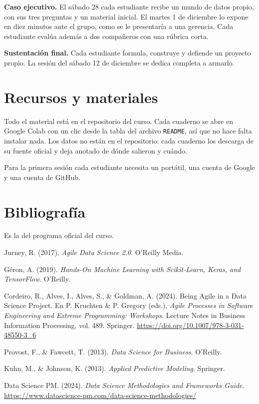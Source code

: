 \documentclass[12pt,letterpaper]{article}
\begin{document}
\textbf{Caso ejecutivo.} El sábado 28 cada estudiante recibe un mundo de datos propio, con sus tres preguntas y un material inicial. El martes 1 de diciembre lo expone en diez minutos ante el grupo, como se le presentaría a una gerencia. Cada estudiante evalúa además a dos compañeros con una rúbrica corta.

\textbf{Sustentación final.} Cada estudiante formula, construye y defiende un proyecto propio. La sesión del sábado 12 de diciembre se dedica completa a armarlo.

\section{Recursos y materiales}
Todo el material está en el repositorio del curso. Cada cuaderno se abre en Google Colab con un clic desde la tabla del archivo \texttt{README}, así que no hace falta instalar nada. Los datos no están en el repositorio: cada cuaderno los descarga de su fuente oficial y deja anotado de dónde salieron y cuándo.

Para la primera sesión cada estudiante necesita un portátil, una cuenta de Google y una cuenta de GitHub.

\section{Bibliografía}
Es la del programa oficial del curso.

Jurney, R. (2017). \textit{Agile Data Science 2.0}. O'Reilly Media.

Géron, A. (2019). \textit{Hands-On Machine Learning with Scikit-Learn, Keras, and TensorFlow}. O'Reilly.

Cordeiro, R., Alves, I., Alves, S., \& Goldman, A. (2024). Being Agile in a Data Science Project. En P. Kruchten \& P. Gregory (eds.), \textit{Agile Processes in Software Engineering and Extreme Programming: Workshops}. Lecture Notes in Business Information Processing, vol. 489. Springer. \url{https://doi.org/10.1007/978-3-031-48550-3_6}

Provost, F., \& Fawcett, T. (2013). \textit{Data Science for Business}. O'Reilly.

Kuhn, M., \& Johnson, K. (2013). \textit{Applied Predictive Modeling}. Springer.

Data Science PM. (2024). \textit{Data Science Methodologies and Frameworks Guide}. \url{https://www.datascience-pm.com/data-science-methodologies/}
\end{document}
